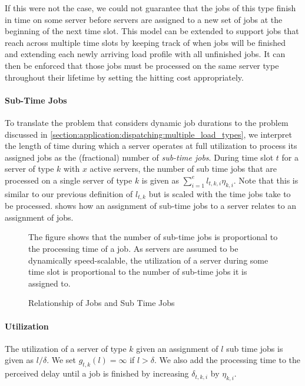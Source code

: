 If this were not the case, we could not guarantee that the jobs of this type finish in time on some server before servers are assigned to a new set of jobs at the beginning of the next time slot. This model can be extended to support jobs that reach across multiple time slots by keeping track of when jobs will be finished and extending each newly arriving load profile with all unfinished jobs. It can then be enforced that those jobs must be processed on the same server type throughout their lifetime by setting the hitting cost appropriately.

\paragraph{Sub-Time Jobs} To translate the problem that considers dynamic job durations to the problem discussed in \cref{section:application:dispatching:multiple_load_types}, we interpret the length of time during which a server operates at full utilization to process its assigned jobs as the (fractional) number of \emph{sub-time jobs}. During time slot $t$ for a server of type $k$ with $x$ active servers, the number of sub time jobs that are processed on a single server of type $k$ is given as $\sum_{i=1}^e l_{t,k,i} \eta_{k,i}$. Note that this is similar to our previous definition of $l_{t,k}$ but is scaled with the time jobs take to be processed.  shows how an assignment of sub-time jobs to a server relates to an assignment of jobs.

\begin{figure}
    \centering
    [TODO]

    The figure shows that the number of sub-time jobs is proportional to the processing time of a job. As servers are assumed to be dynamically speed-scalable, the utilization of a server during some time slot is proportional to the number of sub-time jobs it is assigned to.
    \caption{Relationship of Jobs and Sub Time Jobs}
    \label{fig:dynamic_job_duration}
\end{figure}

\paragraph{Utilization} The utilization of a server of type $k$ given an assignment of $l$ sub time jobs is given as $l / \delta$. We set $g_{t,k}(l) = \infty$ if $l > \delta$. We also add the processing time to the perceived delay until a job is finished by increasing $\delta_{t,k,i}$ by $\eta_{k,i}$.

